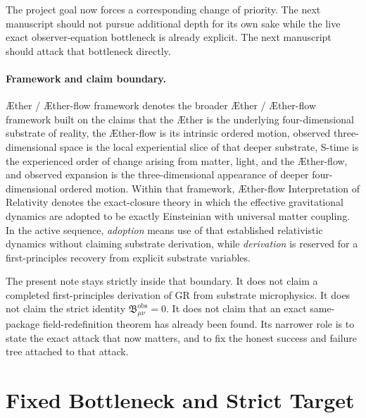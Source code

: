 \documentclass[11pt]{article}
\newcommand{\Aether}{\AE{}ther}
\newcommand{\Aflow}{\AE{}ther-flow}
\newcommand{\TheoryName}{\Aflow{} Interpretation of Relativity}
\newcommand{\TheoryProgram}{\Aether{} / \Aflow{} framework}
\newcommand{\ObsBurden}{\mathfrak B_{\mu\nu}^{\mathrm{obs}}}
\begin{document}
The project goal now forces a corresponding change of priority. The next manuscript should not pursue additional depth for its own sake while the live exact observer-equation bottleneck is already explicit. The next manuscript should attack that bottleneck directly.

\paragraph{Framework and claim boundary.}
\TheoryProgram{} denotes the broader \Aether{} / \Aflow{} framework built on the claims that the \Aether{} is the underlying four-dimensional substrate of reality, the \Aflow{} is its intrinsic ordered motion, observed three-dimensional space is the local experiential slice of that deeper substrate, S-time is the experienced order of change arising from matter, light, and the \Aflow{}, and observed expansion is the three-dimensional appearance of deeper four-dimensional ordered motion. Within that framework, \TheoryName{} denotes the exact-closure theory in which the effective gravitational dynamics are adopted to be exactly Einsteinian with universal matter coupling. In the active sequence, \emph{adoption} means use of that established relativistic dynamics without claiming substrate derivation, while \emph{derivation} is reserved for a first-principles recovery from explicit substrate variables.

The present note stays strictly inside that boundary. It does not claim a completed first-principles derivation of GR from substrate microphysics. It does not claim the strict identity \(\ObsBurden=0\). It does not claim that an exact same-package field-redefinition theorem has already been found. Its narrower role is to state the exact attack that now matters, and to fix the honest success and failure tree attached to that attack.

\section{Fixed Bottleneck and Strict Target}
\end{document}
